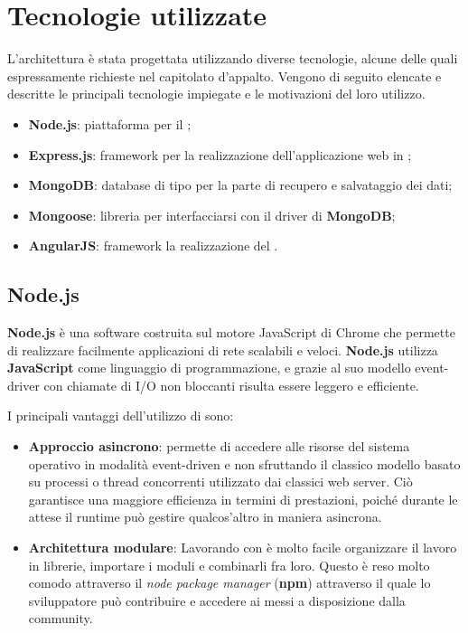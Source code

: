 \section{Tecnologie utilizzate}


L'architettura è stata progettata utilizzando diverse tecnologie, alcune delle quali espressamente richieste nel capitolato d'appalto. Vengono di seguito elencate e descritte le principali tecnologie impiegate e le motivazioni del loro utilizzo.

\begin{itemize}
	\item \textbf{Node.js}: piattaforma per il ;
	\item \textbf{Express.js}: framework per la realizzazione dell’applicazione web in ;
	\item \textbf{MongoDB}: database di tipo  per la parte di recupero e salvataggio dei dati;
	\item \textbf{Mongoose}: libreria per interfacciarsi con il driver di \textbf{MongoDB};
	\item \textbf{AngularJS}: framework  la realizzazione del .
\end{itemize}

\subsection{Node.js}
\textbf{Node.js} è una  software costruita sul motore JavaScript di Chrome che permette di realizzare facilmente applicazioni di rete scalabili e veloci. \textbf{Node.js} utilizza \textbf{JavaScript} come linguaggio di programmazione, e grazie al suo modello event-driver con chiamate di I/O non bloccanti risulta essere leggero e efficiente.

I principali vantaggi dell'utilizzo di  sono:
\begin{itemize}
	\item \textbf{Approccio asincrono}:  permette di accedere alle risorse del sistema operativo in modalità event-driven e non sfruttando il classico modello basato su processi o thread concorrenti utilizzato dai classici web server. Ciò garantisce una maggiore efficienza in termini di prestazioni, poiché durante le attese il runtime può gestire qualcos’altro in maniera asincrona.
	\item \textbf{Architettura modulare}: Lavorando con  è molto facile organizzare il lavoro in librerie, importare i moduli e combinarli fra loro. Questo è reso molto comodo attraverso il \emph{node package manager} (\textbf{npm}) attraverso il quale lo sviluppatore può contribuire e accedere ai  messi a disposizione dalla community.
\end{itemize}

